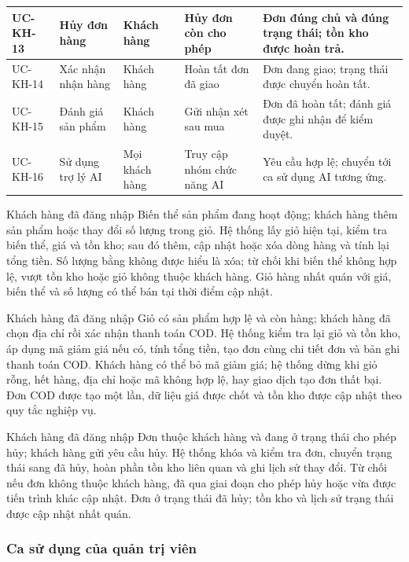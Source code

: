 \begin{longtable}{|p{}|p{}|p{}|p{}|p{}|}
    UC-KH-13 & Hủy đơn hàng & Khách hàng & Hủy đơn còn cho phép & Đơn đúng chủ và đúng trạng thái; tồn kho được hoàn trả. \\ \hline
    UC-KH-14 & Xác nhận nhận hàng & Khách hàng & Hoàn tất đơn đã giao & Đơn đang giao; trạng thái được chuyển hoàn tất. \\ \hline
    UC-KH-15 & Đánh giá sản phẩm & Khách hàng & Gửi nhận xét sau mua & Đơn đã hoàn tất; đánh giá được ghi nhận để kiểm duyệt. \\ \hline
    UC-KH-16 & Sử dụng trợ lý AI & Mọi khách hàng & Truy cập nhóm chức năng AI & Yêu cầu hợp lệ; chuyển tới ca sử dụng AI tương ứng. \\ \hline
\end{longtable}

{Khách hàng đã đăng nhập}
{Biến thể sản phẩm đang hoạt động; khách hàng thêm sản phẩm hoặc thay đổi số lượng trong giỏ.}
{Hệ thống lấy giỏ hiện tại, kiểm tra biến thể, giá và tồn kho; sau đó thêm, cập nhật hoặc xóa dòng hàng và tính lại tổng tiền.}
{Số lượng bằng không được hiểu là xóa; từ chối khi biến thể không hợp lệ, vượt tồn kho hoặc giỏ không thuộc khách hàng.}
{Giỏ hàng nhất quán với giá, biến thể và số lượng có thể bán tại thời điểm cập nhật.}

{Khách hàng đã đăng nhập}
{Giỏ có sản phẩm hợp lệ và còn hàng; khách hàng đã chọn địa chỉ rồi xác nhận thanh toán COD.}
{Hệ thống kiểm tra lại giỏ và tồn kho, áp dụng mã giảm giá nếu có, tính tổng tiền, tạo đơn cùng chi tiết đơn và bản ghi thanh toán COD.}
{Khách hàng có thể bỏ mã giảm giá; hệ thống dừng khi giỏ rỗng, hết hàng, địa chỉ hoặc mã không hợp lệ, hay giao dịch tạo đơn thất bại.}
{Đơn COD được tạo một lần, dữ liệu giá được chốt và tồn kho được cập nhật theo quy tắc nghiệp vụ.}

{Khách hàng đã đăng nhập}
{Đơn thuộc khách hàng và đang ở trạng thái cho phép hủy; khách hàng gửi yêu cầu hủy.}
{Hệ thống khóa và kiểm tra đơn, chuyển trạng thái sang đã hủy, hoàn phần tồn kho liên quan và ghi lịch sử thay đổi.}
{Từ chối nếu đơn không thuộc khách hàng, đã qua giai đoạn cho phép hủy hoặc vừa được tiến trình khác cập nhật.}
{Đơn ở trạng thái đã hủy; tồn kho và lịch sử trạng thái được cập nhật nhất quán.}

\subsubsection{Ca sử dụng của quản trị viên}

